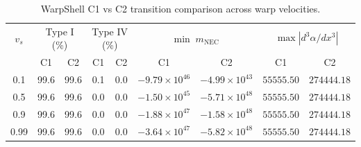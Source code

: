 \begin{table}
\centering
\caption{WarpShell C1 vs C2 transition comparison across warp velocities.}
\label{tab:c1-vs-c2}
\begin{tabular}{c cc cc cc cc}
\hline\hline
$v_s$ & \multicolumn{2}{c}{Type I (\%)} & \multicolumn{2}{c}{Type IV (\%)} & \multicolumn{2}{c}{$\min\;m_{\mathrm{NEC}}$} & \multicolumn{2}{c}{$\max|d^3\alpha/dx^3|$} \\
 & C1 & C2 & C1 & C2 & C1 & C2 & C1 & C2 \\
\hline
  0.1 & 99.6 & 99.6 & 0.1 & 0.0 & $-9.79 \times 10^{46}$ & $-4.99 \times 10^{43}$ & $55555.50$ & $274444.18$ \\
  0.5 & 99.6 & 99.6 & 0.0 & 0.0 & $-1.50 \times 10^{45}$ & $-5.71 \times 10^{48}$ & $55555.50$ & $274444.18$ \\
  0.9 & 99.6 & 99.6 & 0.0 & 0.0 & $-1.88 \times 10^{47}$ & $-1.58 \times 10^{48}$ & $55555.50$ & $274444.18$ \\
  0.99 & 99.6 & 99.6 & 0.0 & 0.0 & $-3.64 \times 10^{47}$ & $-5.82 \times 10^{48}$ & $55555.50$ & $274444.18$ \\
\hline\hline
\end{tabular}
\end{table}